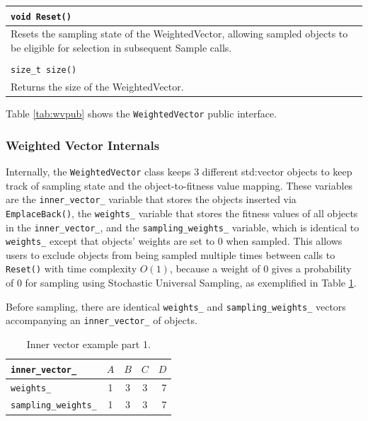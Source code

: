 \documentclass[12pt]{article}
\begin{document}
\begin{table}[htbp]
\begin{tabular}{ | p{1.0\linewidth} | }
      \\ \hline

      \verb|void Reset()|\\ \hline

      Resets the sampling state of the WeightedVector, allowing sampled objects
      to be eligible for selection in subsequent Sample calls.\\ \hline

      \\ \hline

      \verb|size_t size()|\\ \hline

      Returns the size of the WeightedVector.\\ \hline
    \end{tabular}
  \end{table}

  Table \ref{tab:wvpub} shows the \texttt{WeightedVector} public interface.

  \FloatBarrier

    \subsubsection{Weighted Vector Internals}

    Internally, the \texttt{WeightedVector} class keeps 3 different std:vector
    objects to keep track of sampling state and the object-to-fitness value
    mapping.  These variables are the \texttt{inner\_vector\_} variable that stores the
    objects inserted via \texttt{EmplaceBack()}, the \texttt{weights\_}
    variable that stores the fitness values of all objects in the
    \texttt{inner\_vector\_}, and the \texttt{sampling\_weights\_} variable,
    which is identical to \texttt{weights\_} except that objects' weights are
    set to 0 when sampled. This allows users to exclude objects from being sampled
    multiple times between calls to \texttt{Reset()} with time complexity
    $O(1)$, because a weight of 0 gives a probability of 0 for sampling using
    Stochastic Universal Sampling, as exemplified in Table \ref{tbl:inner-vec-1}.

    Before sampling, there are identical \texttt{weights\_} and
    \texttt{sampling\_weights\_} vectors accompanying an
    \texttt{inner\_vector\_} of objects.

    \begin{table}[htbp]
      \caption{Inner vector example part 1.}
      \label{tbl:inner-vec-1}
      \begin{center}
      \begin{tabular}{ | l | c | c | c | r | }
        \hline
        \verb|inner_vector_| & $A$ & $B$ & $C$ & $D$ \\ \hline
        \verb|weights_| & 1 & 3 & 3 & 7 \\ \hline
        \verb|sampling_weights_| & 1 & 3 & 3 & 7 \\ \hline
        \hline
      \end{tabular}
      \end{center}
    \end{table}
\end{document}
